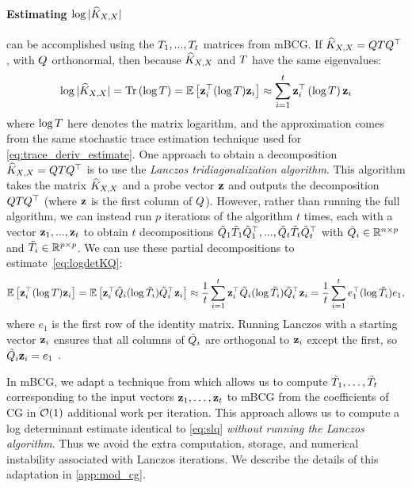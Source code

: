 \paragraph{Estimating $\log \vert \widehat{K}_{X,X} \vert$}
can be accomplished using the $T_{1},...,T_{t}$ matrices from mBCG. If $\widehat{K}_{X,X}=QTQ^{\top}$, with $Q$ orthonormal, then because $\widehat{K}_{X,X}$ and $T$ have the same eigenvalues:
\begin{equation}
  \log \vert \trainK \vert = \tr{\log \bT}  = \Ev{\bz_i^\top (\log \bT)\bz_i} \approx \sum_{i=1}^{t}\bz_{i}^\top \left( \log \bT \right) \bz_{i}\label{eq:logdetKQ}
\end{equation}
where $\log T$ here denotes the matrix logarithm, and the approximation comes from the same stochastic trace estimation technique used for \eqref{eq:trace_deriv_estimate}. One approach to obtain a decomposition $\widehat{K}_{X,X}=QTQ^{\top}$ is to use the \emph{Lanczos tridiagonalization algorithm}. This algorithm takes the matrix $\widehat{K}_{X,X}$ and a probe vector $\mathbf{z}$ and outputs the decomposition $QTQ^{\top}$ (where $\mathbf{z}$ is the first column of $Q$). However, rather than running the full algorithm, we can instead run $p$ iterations of the algorithm $t$ times, each with a vector $\mathbf{z}_{1},...,\mathbf{z}_{t}$ to obtain $t$ decompositions  $\tilde{Q}_{1}\tilde{T}_{1}\tilde{Q}_{1}^{\top},...,\tilde{Q}_{t}\tilde{T}_{t}\tilde{Q}_{t}^{\top}$ with $\tilde{Q}_{i} \in \mathbb{R}^{n \times p}$ and $\tilde{T}_{i} \in \mathbb{R}^{p \times p}$. We can use these partial decompositions to estimate~\eqref{eq:logdetKQ}:
\begin{equation}
  \operatorname*{\mathbb{E}} \left[ \mathbf{z}_i^\top (\log T)\mathbf{z}_i \right] = \operatorname*{\mathbb{E}} \left[ \mathbf{z}_i^\top  \tilde{Q}_{i}(\log \tilde{T}_{i}) \tilde{Q}_{i}^{\top}\mathbf{z}_{i} \right] \approx \frac{1}{t} \sum_{i=1}^{t} \mathbf{z}_i^{\top} \tilde{Q}_{i}(\log \tilde{T}_{i})\tilde{Q}_{i}^{\top}\mathbf{z}_{i} = \frac{1}{t} \sum_{i=1}^{t}e_{1}^{\top}(\log \tilde{T}_{i})e_{1},
  \label{eq:slq}
\end{equation}
where $e_{1}$ is the first row of the identity matrix. Running Lanczos with a starting vector $\mathbf{z}_{i}$ ensures that all columns of $\tilde{Q}_{i}$ are orthogonal to $\mathbf{z}_{i}$ except the first, so $\tilde{Q}_{i}\mathbf{z}_{i} = e_{1}$ \cite{dong2017scalable,ubaru2017fast,golub2009matrices}.

In mBCG, we adapt a technique from \citet{saad2003iterative} which allows us to compute $\tilde{T}_{1},\ldots,\tilde{T}_{t}$ corresponding to the input vectors $\mathbf{z}_{1},\ldots,\mathbf{z}_{t}$  to mBCG from the coefficients of CG in $\bigo{1}$ additional work per iteration.
This approach allows us to compute a log determinant estimate identical to \eqref{eq:slq} \emph{without running the Lanczos algorithm}.
Thus we avoid the extra computation, storage, and numerical instability associated with Lanczos iterations.
We describe the details of this adaptation in \autoref{app:mod_cg}.

